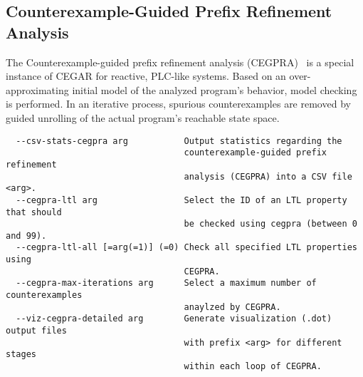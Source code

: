 \documentclass[natbib]{article}
\begin{document}
\subsection{Counterexample-Guided Prefix Refinement Analysis}
The Counterexample-guided prefix refinement analysis (CEGPRA)~\cite{jasper2014counterexample} is a special instance 
of CEGAR for reactive, PLC-like systems.
Based on an over-approximating initial model of the analyzed program's behavior, model checking is performed. In an iterative process, spurious counterexamples are removed by guided unrolling of the actual program's reachable state space. 
\begin{verbatim}
  --csv-stats-cegpra arg           Output statistics regarding the 
                                   counterexample-guided prefix refinement 
                                   analysis (CEGPRA) into a CSV file <arg>.
  --cegpra-ltl arg                 Select the ID of an LTL property that should
                                   be checked using cegpra (between 0 and 99).
  --cegpra-ltl-all [=arg(=1)] (=0) Check all specified LTL properties using 
                                   CEGPRA.
  --cegpra-max-iterations arg      Select a maximum number of counterexamples 
                                   anaylzed by CEGPRA.
  --viz-cegpra-detailed arg        Generate visualization (.dot) output files 
                                   with prefix <arg> for different stages 
                                   within each loop of CEGPRA.
\end{verbatim}
\end{document}
